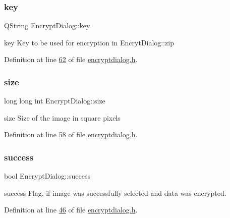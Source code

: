 \mbox{\label{class_encrypt_dialog_a1afdef3c665fb0d0fae06d1df8e84951}} 
\subsubsection{\texorpdfstring{key}{key}}
{\footnotesize\ttfamily Q\+String Encrypt\+Dialog\+::key}



key Key to be used for encryption in Encryt\+Dialog\+::zip 



Definition at line \mbox{\hyperlink{encryptdialog_8h_source_l00062}{62}} of file \mbox{\hyperlink{encryptdialog_8h_source}{encryptdialog.\+h}}.

\mbox{\label{class_encrypt_dialog_a7fff26f838ab50f807744cd2c4bed033}} 
\subsubsection{\texorpdfstring{size}{size}}
{\footnotesize\ttfamily long long int Encrypt\+Dialog\+::size}



size Size of the image in square pixels 



Definition at line \mbox{\hyperlink{encryptdialog_8h_source_l00058}{58}} of file \mbox{\hyperlink{encryptdialog_8h_source}{encryptdialog.\+h}}.

\mbox{\label{class_encrypt_dialog_ada4900bcd40894d9c098c65aa4066ac9}} 
\subsubsection{\texorpdfstring{success}{success}}
{\footnotesize\ttfamily bool Encrypt\+Dialog\+::success}



success Flag, if image was successfully selected and data was encrypted. 



Definition at line \mbox{\hyperlink{encryptdialog_8h_source_l00046}{46}} of file \mbox{\hyperlink{encryptdialog_8h_source}{encryptdialog.\+h}}.

